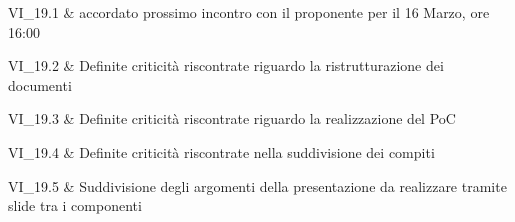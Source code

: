 VI\_19.1 & accordato prossimo incontro con il proponente per il 16 Marzo, ore 16:00

\tabularnewline
VI\_19.2 & Definite criticità riscontrate riguardo la ristrutturazione dei documenti

\tabularnewline
VI\_19.3 & Definite criticità riscontrate riguardo la realizzazione del PoC

\tabularnewline
VI\_19.4 & Definite criticità riscontrate nella suddivisione dei compiti

\tabularnewline
VI\_19.5 & Suddivisione degli argomenti della presentazione da realizzare tramite slide tra i componenti